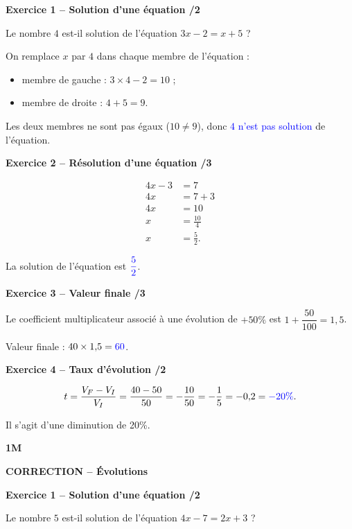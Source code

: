 \documentclass[10pt,a4paper]{article}
\renewcommand{\niveau}{1M}
\renewcommand{\chapitre}{Évolutions}
\renewcommand{\interroversion}[1]{
    \noindent\textbf{\niveau}

    \vspace{-0.5cm}
    \begin{center}
        \textbf{\large CORRECTION -- \chapitre}
    \end{center}

    \vspace{0.1cm}
}
\begin{document}
\textbf{Exercice 1 -- Solution d'une équation \hfill /2}

Le nombre \(4\) est-il solution de l'équation \(3x-2=x+5\) ?

On remplace \(x\) par \(4\) dans chaque membre de l'équation :
\begin{itemize}
\item membre de gauche : \(3\times4-2=10\) ;
\item membre de droite : \(4+5=9\).
\end{itemize}
Les deux membres ne sont pas égaux (\(10\neq9\)), donc \textcolor{blue}{\(4\) n'est pas solution} de l'équation.

\textbf{Exercice 2 -- Résolution d'une équation \hfill /3}

\[
\begin{aligned}
4x-3&=7\\
4x&=7+3\\
4x&=10\\
x&=\frac{10}{4}\\
x&=\frac{5}{2}.
\end{aligned}
\]

La solution de l'équation est \(\textcolor{blue}{\dfrac{5}{2}}\).

\textbf{Exercice 3 -- Valeur finale \hfill /3}

Le coefficient multiplicateur associé à une évolution de \(+50\%\) est \(1+\dfrac{50}{100}=1{,}5\).

Valeur finale : \(40\times1{,}5=\textcolor{blue}{60}\).


\textbf{Exercice 4 -- Taux d'évolution \hfill /2}

\[
t=\frac{V_F-V_I}{V_I}=\frac{40-50}{50}=-\frac{10}{50}=-\frac{1}{5}=-0{,}2=\textcolor{blue}{-20\%}.
\]

Il s'agit d'une diminution de 20\%.


\newpage


\interroversion{C}

\textbf{Exercice 1 -- Solution d'une équation \hfill /2}

Le nombre \(5\) est-il solution de l'équation \(4x-7=2x+3\) ?
\end{document}
